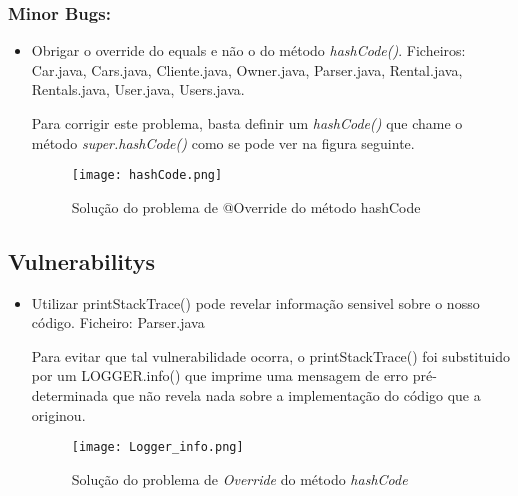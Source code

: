 \subsubsection{Minor Bugs:}
\begin{itemize}
\item Obrigar o override do equals e não o do método \textit{hashCode()}.\newline
 Ficheiros: Car.java, Cars.java, Cliente.java, Owner.java, Parser.java, Rental.java, Rentals.java, User.java, Users.java.\newline


\par Para corrigir este problema, basta definir um \textit{hashCode()} que chame o método \textit{super.hashCode()} como se pode ver na figura seguinte.

\begin{figure}[H]

  \centering

  \texttt{[image: hashCode.png]}

  \caption {Solução do problema de @Override do método hashCode}

  \label {fig08}

\end{figure}

\end{itemize}


\subsection{Vulnerabilitys}
\begin{itemize}
\item Utilizar printStackTrace() pode revelar informação sensivel sobre o nosso código.\newline
 Ficheiro: Parser.java\newline

 \par Para evitar que tal vulnerabilidade ocorra, o printStackTrace() foi substituido por um LOGGER.info() que imprime uma mensagem de erro pré-determinada que não revela nada sobre a implementação do código que a originou.
 \begin{figure}[H]

  \centering

  \texttt{[image: Logger\_info.png]}

  \caption {Solução do problema de \textit{Override} do método \textit{hashCode}}

  \label {fig09}

\end{figure}

\end{itemize}

